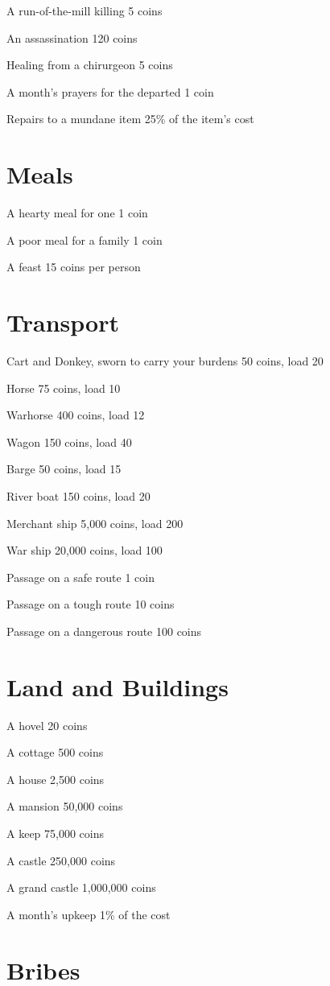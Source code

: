  A run-of-the-mill killing 5 coins


 An assassination 120 coins


 Healing from a chirurgeon 5 coins


 A month's prayers for the departed 1 coin


 Repairs to a mundane item 25\% of the item's cost
\section*{Meals}


 A hearty meal for one 1 coin


 A poor meal for a family 1 coin


 A feast 15 coins per person
\section*{Transport}


 Cart and Donkey, sworn to carry your burdens 50 coins, load 20


 Horse 75 coins, load 10


 Warhorse 400 coins, load 12


 Wagon 150 coins, load 40


 Barge 50 coins, load 15


 River boat 150 coins, load 20


 Merchant ship 5,000 coins, load 200


 War ship 20,000 coins, load 100


 Passage on a safe route 1 coin


 Passage on a tough route 10 coins


 Passage on a dangerous route 100 coins
\section*{Land and Buildings}


 A hovel 20 coins


 A cottage 500 coins


 A house 2,500 coins


 A mansion 50,000 coins


 A keep 75,000 coins


 A castle 250,000 coins


 A grand castle 1,000,000 coins


 A month's upkeep 1\% of the cost
\section*{Bribes}


